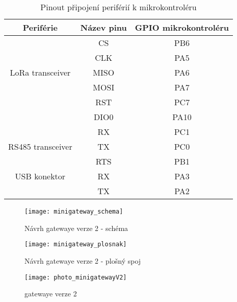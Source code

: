 \newpage
\begin{longtable}{ |c|c|c| }

    \caption{Pinout připojení periférií k mikrokontroléru}
    \label{table:Pinout připojení periférií k mikrokontroléru v2} \\
\hline

Periférie          & Název pinu & GPIO mikrokontroléru           \\ \hline \hline

            & CS    &  PB6             \\
            & CLK   &  PA5        \\
LoRa transceiver    & MISO  &  PA6     \\
            & MOSI  &  PA7        \\
            & RST   & PC7          \\
            & DIO0  & PA10         \\
            \hline

            & RX  &   PC1            \\
RS485 transceiver   & TX  &   PC0       \\
            & RTS  &  PB1      \\     \hline

USB konektor        & RX    & PA3    \\
            & TX    & PA2   \\          \hline
\end{longtable}


\begin{figure}[!h]
    \centering
    \texttt{[image: minigateway\_schema]}
    \caption{Návrh gatewaye verze 2 - schéma}
    \label{fig:minigateway_schema}
\end{figure}

\begin{figure}[!h]
    \centering
    \texttt{[image: minigateway\_plosnak]}
    \caption{Návrh gatewaye verze 2 - plošný spoj}
    \label{fig:minigateway_plosnak}
\end{figure}


\DIFaddbegin {}

\DIFaddend \begin{figure}[!h]
    \centering
    \texttt{[image: photo\_minigatewayV2]}
    \caption{\DIFdelbeginFL {}\DIFdelendFL \DIFaddbeginFL {}\DIFaddendFL gatewaye verze 2\DIFdelbeginFL {}\DIFdelendFL }
    \DIFdelbeginFL %
\DIFdelendFL \DIFaddbeginFL \label{fig:minigateway_fotoV2}
\DIFaddendFL \end{figure}




